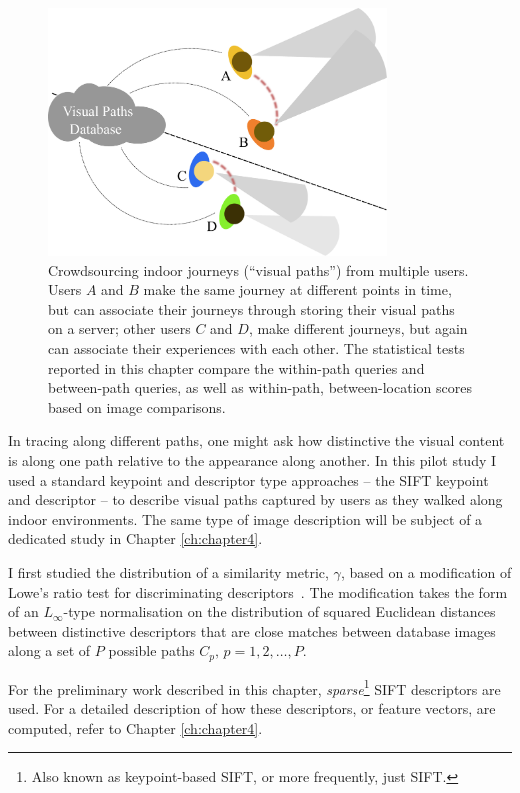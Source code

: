 \begin{figure}[h]
\centering
\includegraphics[width=0.8\textwidth]{./gfx/Chapter02/AssociatingViews.pdf}
\caption{Crowdsourcing indoor journeys (``visual paths'') from multiple users.  Users $A$ and $B$ make the same journey at different points in time, but can associate their journeys through storing their visual paths on a server; other users $C$ and $D$, make different journeys, but again can associate their experiences with each other. The statistical tests reported in this chapter compare the within-path queries and between-path queries, as well as within-path, between-location scores based on image comparisons.}
\label{fig:associatingViews}
\end{figure}

In tracing along different paths, one might ask how distinctive the visual content is along one path relative to the appearance along another. In this pilot study I used a standard keypoint and descriptor type approaches -- the SIFT keypoint and descriptor -- to describe visual paths captured by users as they walked along indoor environments. The same type of image description will be subject of a dedicated study in Chapter \ref{ch:chapter4}.

I first studied the distribution of a similarity metric, $\gamma$, based on a modification of Lowe's ratio test for discriminating descriptors~\cite{lowe2004distinctive}. The modification takes the form of an $L_{\infty}$-type normalisation on the distribution of squared Euclidean distances between distinctive descriptors that are close matches between database images along a set of $P$ possible paths $C_p,\,p=1,2,\ldots, P$.

For the preliminary work described in this chapter, \textit{sparse}\footnote{Also known as keypoint-based SIFT, or more frequently, just SIFT.} SIFT descriptors are used. For a detailed description of how these descriptors, or feature vectors, are computed, refer to Chapter \ref{ch:chapter4}.


